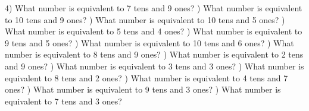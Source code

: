 \documentclass{article}%
\begin{document}
4) What number is equivalent to 7 tens and 9 ones?%
\newline%
\newline%
) What number is equivalent to 10 tens and 9 ones?%
\newline%
\newline%
) What number is equivalent to 10 tens and 5 ones?%
\newline%
\newline%
) What number is equivalent to 5 tens and 4 ones?%
\newline%
\newline%
) What number is equivalent to 9 tens and 5 ones?%
\newline%
\newline%
) What number is equivalent to 10 tens and 6 ones?%
\newline%
\newline%
) What number is equivalent to 8 tens and 9 ones?%
\newline%
\newline%
) What number is equivalent to 2 tens and 9 ones?%
\newline%
\newline%
) What number is equivalent to 3 tens and 3 ones?%
\newline%
\newline%
) What number is equivalent to 8 tens and 2 ones?%
\newline%
\newline%
) What number is equivalent to 4 tens and 7 ones?%
\newline%
\newline%
) What number is equivalent to 9 tens and 3 ones?%
\newline%
\newline%
) What number is equivalent to 7 tens and 3 ones?%
\newline%
\newline%
\newline%
\end{document}
